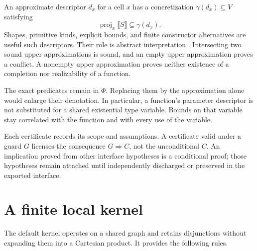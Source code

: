 \documentclass[11pt,a4paper,oneside]{report}
\newcommand{\sem}[1]{\llbracket #1\rrbracket}
\theoremstyle{remark}
\begin{document}
An approximate descriptor $d_x$ for a cell $x$ has a concretization
$\gamma(d_x)\subseteq V$ satisfying
\[
 \operatorname{proj}_x\sem S\subseteq\gamma(d_x).
\]
Shapes, primitive kinds, explicit bounds, and finite constructor alternatives
are useful such descriptors. Their role is abstract interpretation
\cite{cousot77}. Intersecting two sound upper approximations is sound, and an
empty upper approximation proves a conflict. A nonempty upper approximation
proves neither existence of a completion nor realizability of a function.

The exact predicates remain in $\Phi$. Replacing them by the approximation alone
would enlarge their denotation. In particular, a function's parameter descriptor
is not substituted for a shared existential type variable. Bounds on that
variable stay correlated with the function and with every use of the variable.

Each certificate records its scope and assumptions. A certificate valid under a
guard $G$ licenses the consequence $G\Rightarrow C$, not the unconditional $C$.
An implication proved from other interface hypotheses is a conditional proof;
those hypotheses remain attached until independently discharged or preserved in
the exported interface.

\section{A finite local kernel}
The default kernel operates on a shared graph and retains disjunctions without
expanding them into a Cartesian product. It provides the following rules.
\end{document}
